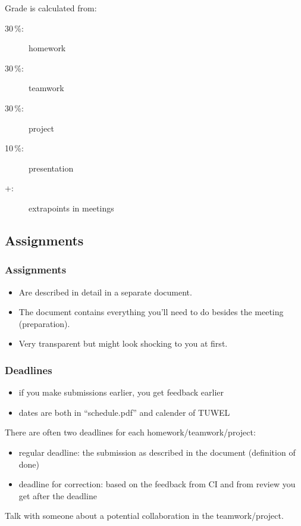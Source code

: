 \begin{frame}
	Grade is calculated from:
	\begin{description}
	\item[30\,\%:] homework
	\item[30\,\%:] teamwork
	\item[30\,\%:] project
	\item[10\,\%:] presentation
	\item[+:] extrapoints in meetings
	\end{description}
\end{frame}

\subsection{Assignments}
\begin{frame}
	\frametitle{Assignments}
	\begin{itemize}
		\item Are described in detail in a separate document.
		\item The document contains everything you'll need to do besides the meeting (preparation).
		\item Very transparent but might look shocking to you at first.
	\end{itemize}
\end{frame}

\begin{frame}
	\frametitle{Deadlines}

	\begin{itemize}
	\item if you make submissions earlier, you get feedback earlier
	\item dates are both in ``schedule.pdf'' and calender of TUWEL
	\end{itemize}

	There are often two deadlines for each homework/teamwork/project:

	\begin{itemize}
	\item regular deadline: the submission as described in the document (definition of done)
	\item deadline for correction: based on the feedback from CI and from review you get after the deadline
	\end{itemize}
\end{frame}

\begin{assignment}
	\begin{task}
	Talk with someone about a potential collaboration in the teamwork/project.
	\end{task}
\end{assignment}

